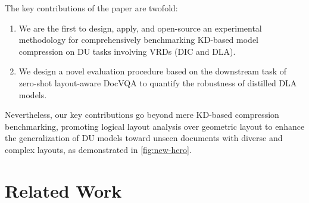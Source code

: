 \documentclass[runningheads]{llncs}
\begin{document}
\noindent The key contributions of the paper are twofold:
\begin{enumerate}
    [label=\Roman*.,leftmargin=2\parindent]
    \item  We are the first to design, apply, and open-source an experimental methodology for comprehensively benchmarking KD-based model compression on DU tasks involving VRDs (DIC and DLA).
    \item  We design a novel evaluation procedure based on the downstream task of zero-shot layout-aware DocVQA to quantify the robustness of distilled DLA models.
\end{enumerate}

\noindent Nevertheless, our key contributions go beyond mere KD-based compression benchmarking, promoting logical layout analysis over geometric layout to enhance the generalization of DU models toward unseen documents with diverse and complex layouts, as demonstrated in \cref{fig:new-hero}.

\section{Related Work}
\end{document}
